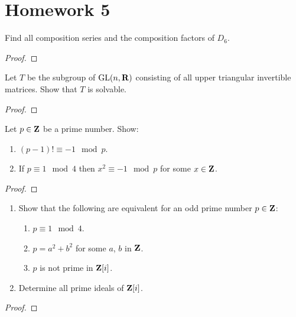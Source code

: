 \section{Homework 5}
\begin{problem}
Find all composition series and the composition factors of $D_6$.
\end{problem}
\begin{proof}
\end{proof}

\begin{problem}
Let $T$ be the subgroup of $\mathrm{GL}(n,\mathbf{R})$ consisting of all upper triangular
invertible matrices. Show that $T$ is solvable.
\end{problem}
\begin{proof}
\end{proof}

\begin{problem}
Let $p\in\mathbf{Z}$ be a prime number. Show:
\begin{enumerate}[label=(\alph*)]
\item $(p-1)!\equiv -1\mod{p}$.
\item If $p\equiv 1\mod{4}$ then $x^2\equiv -1\mod{p}$ for some
  $x\in\mathbf{Z}$.
\end{enumerate}
\end{problem}
\begin{proof}
\end{proof}

\begin{problem}
\begin{enumerate}[label=(\alph*)]
\item Show that the following are equivalent for an odd prime number
  $p\in\mathbf{Z}$:
  \begin{enumerate}[label=(\roman*)]
  \item $p\equiv 1\mod 4$.
  \item $p=a^2+b^2$ for some $a$, $b$ in $\mathbf{Z}$.
  \item $p$ is not prime in $\mathbf{Z}[i]$.
  \end{enumerate}
\item Determine all prime ideals of $\mathbf{Z}[i]$.
\end{enumerate}
\end{problem}
\begin{proof}
\end{proof}

